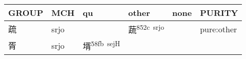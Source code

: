 \documentclass[14pt,a4paper]{scrartcl}
\begin{document}
\begin{longtable}[c]{@{}llllll@{}}
\toprule
\begin{minipage}[b]{0.14\columnwidth}\raggedright\strut
GROUP
\strut\end{minipage} &
\begin{minipage}[b]{0.14\columnwidth}\raggedright\strut
MCH
\strut\end{minipage} &
\begin{minipage}[b]{0.14\columnwidth}\raggedright\strut
qu
\strut\end{minipage} &
\begin{minipage}[b]{0.14\columnwidth}\raggedright\strut
other
\strut\end{minipage} &
\begin{minipage}[b]{0.14\columnwidth}\raggedright\strut
none
\strut\end{minipage} &
\begin{minipage}[b]{0.14\columnwidth}\raggedright\strut
PURITY
\strut\end{minipage}\tabularnewline
\midrule
\endhead
\begin{minipage}[t]{0.14\columnwidth}\raggedright\strut
疏
\strut\end{minipage} &
\begin{minipage}[t]{0.14\columnwidth}\raggedright\strut
srjo
\strut\end{minipage} &
\begin{minipage}[t]{0.14\columnwidth}\raggedright\strut
\strut\end{minipage} &
\begin{minipage}[t]{0.14\columnwidth}\raggedright\strut
蔬\textsuperscript{852c~srjo}
\strut\end{minipage} &
\begin{minipage}[t]{0.14\columnwidth}\raggedright\strut
\strut\end{minipage} &
\begin{minipage}[t]{0.14\columnwidth}\raggedright\strut
pure:other
\strut\end{minipage}\tabularnewline
\begin{minipage}[t]{0.14\columnwidth}\raggedright\strut
胥
\strut\end{minipage} &
\begin{minipage}[t]{0.14\columnwidth}\raggedright\strut
srjo
\strut\end{minipage} &
\begin{minipage}[t]{0.14\columnwidth}\raggedright\strut
壻\textsuperscript{58fb~sejH}
\strut\end{minipage} &

\end{longtable}
\end{document}
